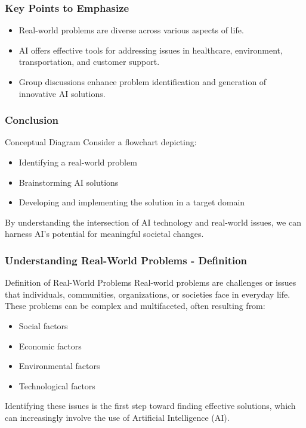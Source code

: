 \documentclass{beamer}
\begin{document}
\begin{frame}[fragile]
    \frametitle{Key Points to Emphasize}
    \begin{itemize}
        \item Real-world problems are diverse across various aspects of life.
        \item AI offers effective tools for addressing issues in healthcare, environment, transportation, and customer support.
        \item Group discussions enhance problem identification and generation of innovative AI solutions.
    \end{itemize}
\end{frame}

\begin{frame}[fragile]
    \frametitle{Conclusion}
    \begin{block}{Conceptual Diagram}
        Consider a flowchart depicting:
        \begin{itemize}
            \item Identifying a real-world problem
            \item Brainstorming AI solutions
            \item Developing and implementing the solution in a target domain
        \end{itemize}
    \end{block}
    By understanding the intersection of AI technology and real-world issues, we can harness AI's potential for meaningful societal changes.
\end{frame}

\begin{frame}[fragile]
    \frametitle{Understanding Real-World Problems - Definition}
    \begin{block}{Definition of Real-World Problems}
        Real-world problems are challenges or issues that individuals, communities, organizations, or societies face in everyday life. 
        These problems can be complex and multifaceted, often resulting from:
        \begin{itemize}
            \item Social factors
            \item Economic factors
            \item Environmental factors
            \item Technological factors
        \end{itemize}
        Identifying these issues is the first step toward finding effective solutions, which can increasingly involve the use of Artificial Intelligence (AI).
    \end{block}
\end{frame}
\end{document}
